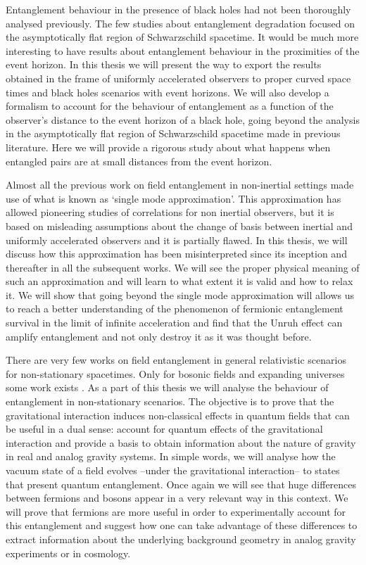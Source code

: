 Entanglement behaviour in the presence of black holes had not been thoroughly analysed previously. The few studies about entanglement degradation focused on the asymptotically flat region of Schwarzschild spacetime. It would be much more interesting to have results about  entanglement behaviour in the proximities of the event horizon. In this thesis we will present the way to export the results obtained in the frame of uniformly accelerated observers to proper curved space times and black holes scenarios with event horizons. We will also develop a formalism to account for the behaviour of entanglement as a function of the observer's distance to the event horizon of a black hole,  going beyond the analysis in the asymptotically flat region of Schwarzschild spacetime made in previous literature. Here we will provide a rigorous study about what happens when entangled pairs are at small distances from the event horizon.

Almost all the previous work on field entanglement in non-inertial settings made use of what is known as `single mode approximation'. This approximation has allowed pioneering studies of correlations for non inertial observers, but it is based on misleading assumptions about the change of basis between inertial and uniformly accelerated observers and it is partially flawed. In this thesis, we will discuss how this approximation has been misinterpreted since its inception \cite{Alsingtelep,AlsingMcmhMil} and thereafter in all the subsequent works.  We will see the proper physical meaning of such an approximation and will learn to what extent it is valid and how to relax it. We will show that going beyond the single mode approximation will allows us to reach a better understanding of the phenomenon of fermionic entanglement survival in the limit of infinite acceleration \cite{AlsingSchul} and find that the Unruh effect can amplify entanglement and not only destroy it as it was thought before.

There are very few works on field entanglement in general relativistic scenarios for non-stationary spacetimes. Only for bosonic fields and expanding universes some work exists \cite{caball}. As a part of this thesis we will analyse the behaviour of entanglement in non-stationary scenarios. The objective is to prove that the gravitational interaction induces non-classical effects in quantum fields that can be useful in a dual sense: account for quantum effects of the gravitational interaction and provide a basis to obtain information about the nature of gravity in real and analog gravity systems. In simple words, we will analyse how the vacuum state of a field evolves --under the gravitational interaction-- to states that present quantum entanglement. Once again we will see that  huge differences between fermions and bosons appear in a very relevant way in this context. We will prove that fermions are more useful in order to experimentally account for this entanglement and suggest how one can take advantage of these differences to extract information about the underlying background geometry in analog gravity experiments or in cosmology.

